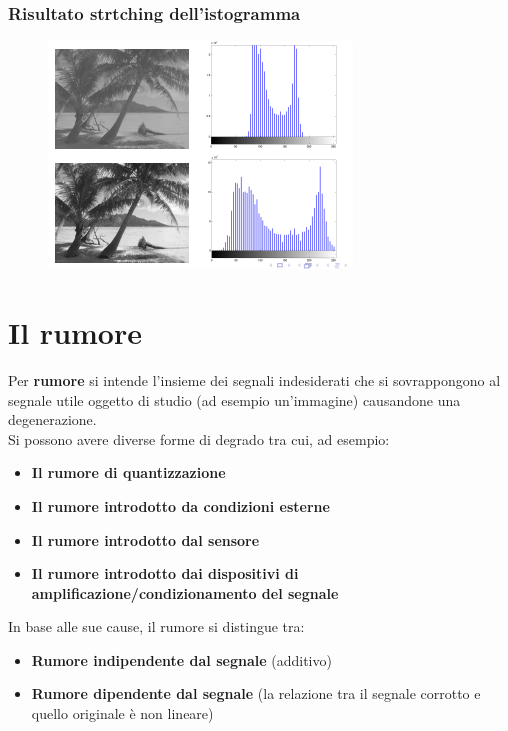 \subsubsection{Risultato strtching dell'istogramma}

\begin{figure}[H]
    \centering
    \includegraphics[width=\linewidth, keepaspectratio]{capitoli/immagini/imgs/stretch-isto.png}
\end{figure}

\section{Il rumore}

Per \textbf{rumore} si intende l'insieme dei segnali indesiderati che si sovrappongono al segnale utile oggetto di studio (ad esempio un'immagine) causandone una degenerazione.
\\
Si possono avere diverse forme di degrado tra cui, ad esempio:
\begin{itemize}
    \item \textbf{Il rumore di quantizzazione}
    \item \textbf{Il rumore introdotto da condizioni esterne}
    \item \textbf{Il rumore introdotto dal sensore}
    \item \textbf{Il rumore introdotto dai dispositivi di amplificazione/condizionamento del segnale}
\end{itemize}

In base alle sue cause, il rumore si distingue tra:
\begin{itemize}
    \item \textbf{Rumore indipendente dal segnale} (additivo)
    \item \textbf{Rumore dipendente dal segnale} (la relazione tra il segnale corrotto e quello originale è non lineare)
\end{itemize}

